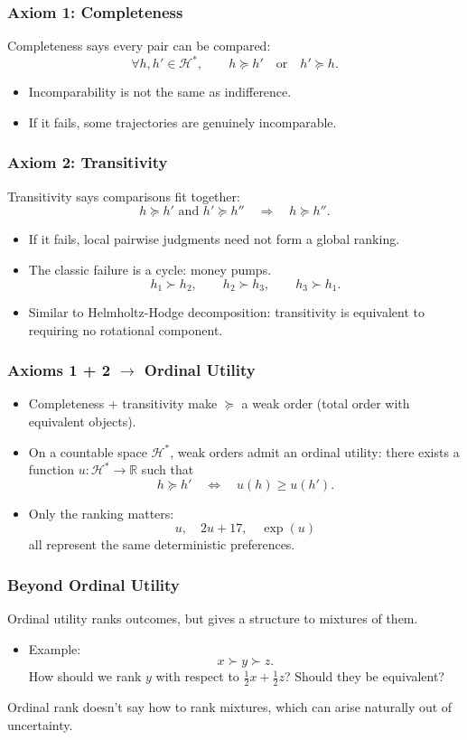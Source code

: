 \documentclass[10pt,a4paper]{beamer}
\newcommand{\Hcal}{\mathcal{H}}
\newcommand{\R}{\mathbb{R}}
\newcommand{\pref}{\succcurlyeq}
\newcommand{\strictpref}{\succ}
\begin{document}
\begin{frame}
\frametitle{Axiom 1: Completeness}
Completeness says every pair can be compared:
    $$
    \forall h,h'\in\Hcal^*,\qquad h\pref h'
    \quad\text{or}\quad h'\pref h.
    $$
\pause
\begin{itemize}
    \item Incomparability is not the same as indifference.
    \pause
    \item If it fails, some trajectories are genuinely incomparable.
\end{itemize}
\end{frame}

\begin{frame}
\frametitle{Axiom 2: Transitivity}
Transitivity says comparisons fit together:
    $$
    h\pref h'\text{ and }h'\pref h''
    \quad\Longrightarrow\quad
    h\pref h''.
    $$
    \pause
\begin{itemize}
    \item If it fails, local pairwise judgments need not form a global ranking.
    \pause
    \item The classic failure is a cycle: money pumps.
    $$
    h_1\strictpref h_2,\qquad
    h_2\strictpref h_3,\qquad
    h_3\strictpref h_1.
    $$
    \item Similar to Helmholtz-Hodge decomposition: transitivity is equivalent to requiring no rotational component.
\end{itemize}
\end{frame}



\begin{frame}
\frametitle{Axioms 1 + 2 $\to$ Ordinal Utility}
\begin{itemize}
    \item Completeness + transitivity make $\pref$ a weak order (total order with equivalent objects).
    \pause
    \item On a countable space $\Hcal^*$, weak orders admit an ordinal utility: 
    there exists a function $u:\Hcal^*\to\R$ such that
    $$
    h\pref h'
    \quad\Longleftrightarrow\quad
    u(h)\geq u(h').
    $$
    \pause
    \item Only the ranking matters:
    $$
    u,\quad 2u+17,\quad \exp(u)
    $$
    all represent the same deterministic preferences.
\end{itemize}
\end{frame}



\begin{frame}
\frametitle{Beyond Ordinal Utility}
Ordinal utility ranks outcomes, but gives a structure to mixtures of them.
\vspace{0.4cm}
\begin{itemize}
    \item Example:
    $$
    x\strictpref y\strictpref z.
    $$
    How should we rank $y$ with respect to
    $\tfrac12 x+\tfrac12 z$? Should they be equivalent?
    \pause
\end{itemize}
\vspace{0.4cm}
Ordinal rank doesn't say how to rank mixtures, which can arise naturally out of uncertainty.
\end{frame}
\end{document}
